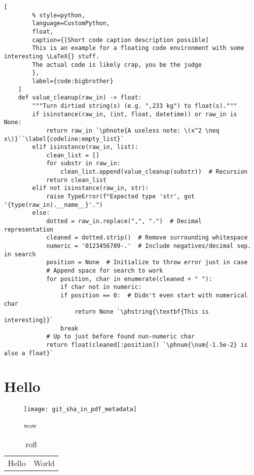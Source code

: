 \lstlistoflistings%

\begin{lstlisting}[
        % style=python,
        language=CustomPython,
        float,
        caption={[Short code caption description possible]
        This is an example for a floating code environment with some interesting \LaTeX{} stuff.
        The actual code is likely crap, you be the judge
        },
        label={code:bigbrother}
    ]
    def value_cleanup(raw_in) -> float:
        """Turn dirtied string(s) (e.g. ",233 kg") to float(s)."""
        if isinstance(raw_in, (int, float, datetime)) or raw_in is None:
            return raw_in `\phnote{A useless note: \(x^2 \neq x\)}``\label{codeline:empty_list}`
        elif isinstance(raw_in, list):
            clean_list = []
            for substr in raw_in:
                clean_list.append(value_cleanup(substr))  # Recursion
            return clean_list
        elif not isinstance(raw_in, str):
            raise TypeError(f"Expected type 'str', got '{type(raw_in).__name__}'.")
        else:
            dotted = raw_in.replace(",", ".")  # Decimal representation
            cleaned = dotted.strip()  # Remove surrounding whitespace
            numeric = '0123456789-.'  # Include negatives/decimal sep. in search
            position = None  # Initialize to throw error just in case
            # Append space for search to work
            for position, char in enumerate(cleaned + " "):
                if char not in numeric:
                if position == 0:  # Didn't even start with numerical char
                    return None `\phstring{\textbf{This is interesting}}`
                break
            # Up to just before found nun-numeric char
            return float(cleaned[:position]) `\phnum{\num{-1.5e-2} is also a float}`
\end{lstlisting}

\chapter{Hello}

\begin{figure}
    \texttt{[image: git\_sha\_in\_pdf\_metadata]}
    \caption{wow}
\end{figure}

\begin{table}
    \begin{tabular}{ll}
        Hello & World\\
    \end{tabular}
    \caption{rofl}
\end{table}
